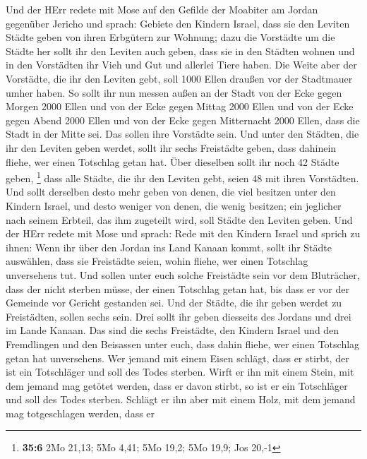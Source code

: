  Und der HErr redete mit Mose auf den Gefilde der Moabiter
am Jordan gegenüber Jericho und sprach:  Gebiete den
Kindern Israel, dass sie den Leviten Städte geben von ihren Erbgütern
zur Wohnung;  dazu die Vorstädte um die Städte her sollt
ihr den Leviten auch geben, dass sie in den Städten wohnen und in den
Vorstädten ihr Vieh und Gut und allerlei Tiere haben.  Die
Weite aber der Vorstädte, die ihr den Leviten gebt, soll 1000 Ellen
draußen vor der Stadtmauer umher haben.  So sollt ihr nun
messen außen an der Stadt von der Ecke gegen Morgen 2000 Ellen und von
der Ecke gegen Mittag 2000 Ellen und von der Ecke gegen Abend 2000 Ellen
und von der Ecke gegen Mitternacht 2000 Ellen, dass die Stadt in der
Mitte sei. Das sollen ihre Vorstädte sein.  Und unter den
Städten, die ihr den Leviten geben werdet, sollt ihr sechs Freistädte
geben, dass dahinein fliehe, wer einen Totschlag getan hat. Über
dieselben sollt ihr noch 42 Städte geben, \footnote{\textbf{35:6} 2Mo
  21,13; 5Mo 4,41; 5Mo 19,2; 5Mo 19,9; Jos 20,-1}  dass
alle Städte, die ihr den Leviten gebt, seien 48 mit ihren Vorstädten.
 Und sollt derselben desto mehr geben von denen, die viel
besitzen unter den Kindern Israel, und desto weniger von denen, die
wenig besitzen; ein jeglicher nach seinem Erbteil, das ihm zugeteilt
wird, soll Städte den Leviten geben.  Und der HErr redete
mit Mose und sprach:  Rede mit den Kindern Israel und
sprich zu ihnen: Wenn ihr über den Jordan ins Land Kanaan kommt,
 sollt ihr Städte auswählen, dass sie Freistädte seien,
wohin fliehe, wer einen Totschlag unversehens tut.  Und
sollen unter euch solche Freistädte sein vor dem Bluträcher, dass der
nicht sterben müsse, der einen Totschlag getan hat, bis dass er vor der
Gemeinde vor Gericht gestanden sei.  Und der Städte, die
ihr geben werdet zu Freistädten, sollen sechs sein.  Drei
sollt ihr geben diesseits des Jordans und drei im Lande Kanaan.
 Das sind die sechs Freistädte, den Kindern Israel und
den Fremdlingen und den Beisassen unter euch, dass dahin fliehe, wer
einen Totschlag getan hat unversehens.  Wer jemand mit
einem Eisen schlägt, dass er stirbt, der ist ein Totschläger und soll
des Todes sterben.  Wirft er ihn mit einem Stein, mit dem
jemand mag getötet werden, dass er davon stirbt, so ist er ein
Totschläger und soll des Todes sterben.  Schlägt er ihn
aber mit einem Holz, mit dem jemand mag totgeschlagen werden, dass er
